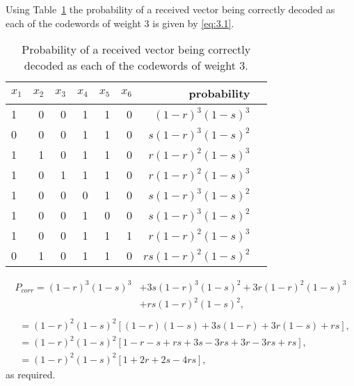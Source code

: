 Using Table~\ref{tab:13} the probability of a received vector being correctly decoded as each of the codewords of weight 3 is given by \eqref{eq:3.1}.
\begin{table}[!htp]\centering
\begin{tabular}{lrrrrr|rr}\toprule
$x_1$ &$x_2$ &$x_3$ &$x_4$ &$x_5$ &$x_6$ &probability \\\midrule
1 &0 &0 &1 &1 &0 &$(1-r)^3(1-s)^3$ \\
0 &0 &0 &1 &1 &0 &$s(1-r)^3(1-s)^2$ \\
1 &1 &0 &1 &1 &0 &$r(1-r)^2(1-s)^3$ \\
1 &0 &1 &1 &1 &0 &$r(1-r)^2(1-s)^3$ \\
1 &0 &0 &0 &1 &0 &$s(1-r)^3(1-s)^2$ \\
1 &0 &0 &1 &0 &0 &$s(1-r)^3(1-s)^2$ \\
1 &0 &0 &1 &1 &1 &$r(1-r)^2(1-s)^3$ \\
0 &1 &0 &1 &1 &0 &$rs(1-r)^2(1-s)^2$ \\
\bottomrule
\end{tabular}
\caption{Probability of a received vector being correctly decoded as each of the codewords of weight 3.}\label{tab:13}
\end{table}
\begin{align*}
	P_{corr} = (1-r)^3(1-s)^3 &+ 3s(1-r)^3(1-s)^2 + 3r(1-r)^2(1-s)^3\\ &+rs(1-r)^2(1-s)^2,\nonumber\\
\end{align*}
\begin{align}
\label{eq:3.1}
	&= (1-r)^2(1-s)^2\left[(1-r)(1-s) + 3s(1-r) + 3r(1-s) + rs	\right],\nonumber\\
	&= (1-r)^2(1-s)^2\left[1-r-s + rs +3s -3rs+3r-3rs+rs\right],\nonumber\\
	&= (1-r)^2(1-s)^2\left[1 + 2r + 2s -4rs\right],
\end{align}
as required.

